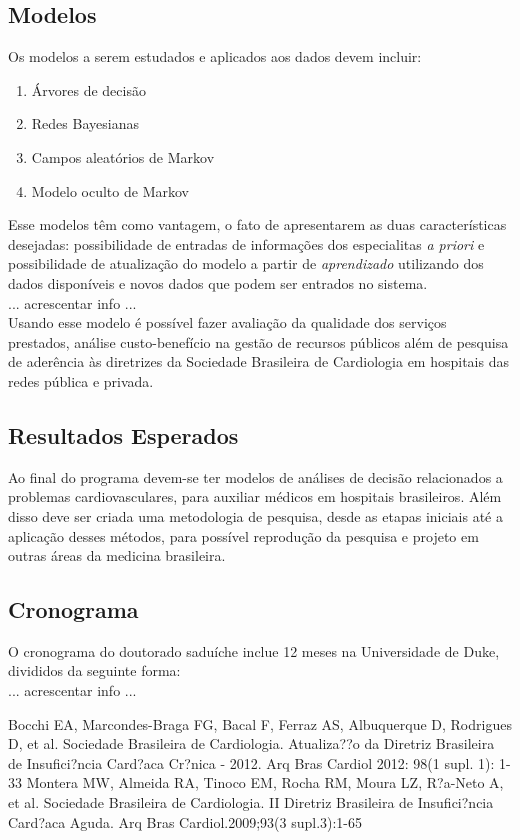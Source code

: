 \documentclass{article}
\begin{document}
\subsection{ \label{subsec:modelos} Modelos}
Os modelos a serem estudados e aplicados aos dados devem incluir:
\begin{enumerate}
\item Árvores de decisão 
\item Redes Bayesianas 
\item Campos aleatórios de Markov
\item Modelo oculto de Markov
\end{enumerate}
Esse modelos têm como vantagem, o fato de apresentarem as duas características desejadas: 
possibilidade de entradas de informações dos especialitas \textit{a priori} e possibilidade de atualização do modelo 
a partir de \textit{aprendizado} utilizando dos dados disponíveis e novos dados que podem ser entrados no sistema.\\
{\color{red} ... acrescentar info ...}\\
Usando esse modelo é possível fazer avaliação da qualidade dos serviços prestados, análise custo-benefício na gestão 
de recursos públicos além de pesquisa de aderência às diretrizes da Sociedade Brasileira de Cardiologia em hospitais 
das redes pública e privada.

\subsection{ \label{sec:resultados} Resultados Esperados}
Ao final do programa devem-se ter modelos de análises de decisão relacionados a problemas cardiovasculares, 
para auxiliar médicos em hospitais brasileiros. Além disso deve ser criada uma metodologia de pesquisa, 
desde as etapas iniciais até a aplicação desses métodos, para possível reprodução da pesquisa e projeto em 
outras áreas da medicina brasileira.

\subsection{ \label{sec:cronograma} Cronograma}
O cronograma do doutorado saduíche inclue 12 meses na Universidade de Duke, divididos da seguinte forma:\\
{\color{red} ... acrescentar info ...}


\clearpage

\begin{thebibliography}{9}
Bocchi EA, Marcondes-Braga FG, Bacal F, Ferraz AS, Albuquerque D, Rodrigues D, et al. Sociedade Brasileira de Cardiologia. Atualiza??o da Diretriz Brasileira de Insufici?ncia Card?aca Cr?nica - 2012. Arq Bras Cardiol 2012: 98(1 supl. 1): 1-33
Montera MW, Almeida RA, Tinoco EM, Rocha RM, Moura LZ, R?a-Neto A, et al.
Sociedade Brasileira de Cardiologia. II Diretriz Brasileira de Insufici?ncia Card?aca Aguda.
Arq Bras Cardiol.2009;93(3 supl.3):1-65
\end{thebibliography}
\end{document}
